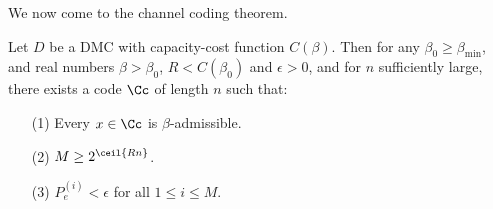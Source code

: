 We now come to the channel coding theorem.

\begin{theorem}\label{3.2.3}
    Let $D$ be a DMC with capacity-cost function  $C(\beta)$. Then for any
    $\beta_0 \geq \beta_{\min}$, and real numbers $\beta>\beta_0$,
    $R<C(\beta_0)$ and $\epsilon>0$, and for $n$ sufficiently large, there
    exists a code $\Cc$ of length $n$ such that:
    \begin{enumerate}
        \item[(1)] Every $x \in \Cc$ is  $\beta$-admissible.

        \item[(2)] $M \geq 2^{\ceil{Rn}}$.

        \item[(3)] $P_e^{(i)}<\epsilon$ for all $1 \leq i \leq M$.
    \end{enumerate}
\end{theorem}
